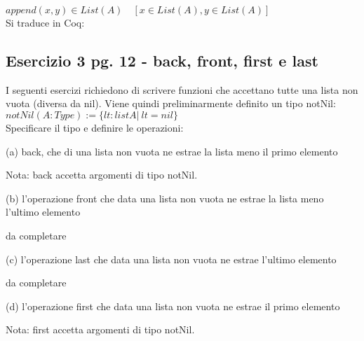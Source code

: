 $append(x,y) \in List(A)\quad[x \in List(A), y \in List(A)]$ \\

Si traduce in Coq:



\subsection{Esercizio 3 pg. 12 - back, front, first e last}

I seguenti esercizi richiedono di scrivere funzioni che accettano tutte una
lista non vuota (diversa da nil). Viene quindi preliminarmente definito un tipo
notNil: \\

$notNil (A : Type) := \{ lt : list A | ~ lt = nil \}$ \\

Specificare il tipo e definire le operazioni:

(a) back, che di una lista non vuota ne estrae la lista meno il primo elemento



Nota: back accetta argomenti di tipo notNil.

(b) l'operazione front che data una lista non vuota ne estrae la lista meno
l'ultimo elemento



da completare

(c) l'operazione last che data una lista non vuota ne estrae l'ultimo elemento



da completare

(d) l'operazione first che data una lista non vuota ne estrae il primo
elemento



Nota: first accetta argomenti di tipo notNil.
